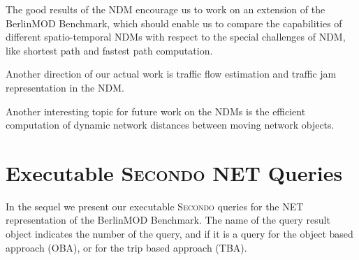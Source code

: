 \documentclass[a4paper]{article}
\newcommand{\secondo}{\textsc{Secondo}}
\newcommand{\bmodb} {BerlinMOD Benchmark}
\begin{document}
The good results of the NDM encourage us to work on an extension
of the \bmodb{}, which should enable us to compare the capabilities of different
spatio-temporal NDMs with respect to the special challenges of
NDM, like shortest path and fastest path computation.

Another direction of our actual work is traffic flow estimation and traffic jam
representation in the NDM.

Another interesting topic for future work on the NDMs is the efficient
computation of dynamic network distances between moving network objects.
{}

\appendix
\section{Executable \secondo{} NET Queries}
\label{app:executableQueries}
In the sequel we present our executable \secondo{} queries for the NET representation
of the \bmodb{}. The name of the query result object indicates the number of
the query, and if it is a query for the object based approach (OBA), or for the
trip based approach (TBA).
\end{document}
